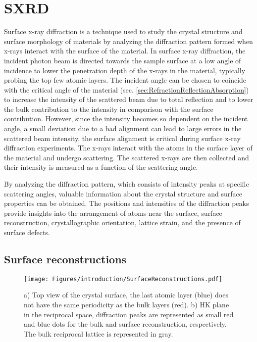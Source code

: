 \newpage
\section{SXRD} \label{sec:SXRD}

Surface x-ray diffraction is a technique used to study the crystal structure and surface morphology of materials by analyzing the diffraction pattern formed when x-rays interact with the surface of the material.
In surface x-ray diffraction, the incident photon beam is directed towards the sample surface at a low angle of incidence to lower the penetration depth of the x-rays in the material, typically probing the top few atomic layers.
The incident angle can be chosen to coincide with the critical angle of the material (sec. \ref{sec:RefractionReflectionAbsorption}) to increase the intensity of the scattered beam due to total reflection and to lower the bulk contribution to the intensity in comparison with the surface contribution.
However, since the intensity becomes so dependent on the incident angle, a small deviation due to a bad alignment can lead to large errors in the scattered beam intensity, the surface alignment is critical during surface x-ray diffraction experiments.
The x-rays interact with the atoms in the surface layer of the material and undergo scattering.
The scattered x-rays are then collected and their intensity is measured as a function of the scattering angle.

By analyzing the diffraction pattern, which consists of intensity peaks at specific scattering angles, valuable information about the crystal structure and surface properties can be obtained.
The positions and intensities of the diffraction peaks provide insights into the arrangement of atoms near the surface, surface reconstruction, crystallographic orientation, lattice strain, and the presence of surface defects.

\subsection{Surface reconstructions} \label{sec:SurfaceReconstructions}

\begin{figure}[!htb]
    \centering
    \texttt{[image: Figures/introduction/SurfaceReconstructions.pdf]}
    \caption{
    a) Top view of the crystal surface, the last atomic layer (blue) does not have the same periodicity as the bulk layers (red).
    b) HK plane in the reciprocal space, diffraction peaks are represented as small red and blue dots for the bulk and surface reconstruction, respectively. The bulk reciprocal lattice is represented in gray.
    }
    \label{fig:SurfaceReconstructions}
\end{figure}

